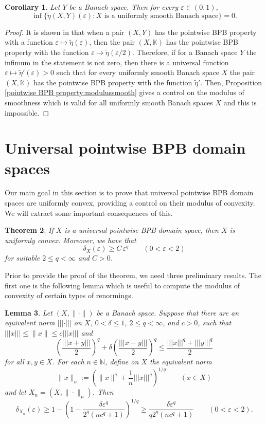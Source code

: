 \documentclass[a4paper,10pt]{amsart}
\theoremstyle{plain}
\newtheorem{theorem}{Theorem}[section]
\newtheorem{corollary}[theorem]{Corollary}
\newtheorem{lemma}[theorem]{Lemma}
\theoremstyle{definition}
\newcommand{\K}{\mathbb{K}}
\newcommand{\N}{\mathbb{N}}
\newcommand{\eps}{\varepsilon}
\renewcommand{\geq}{\geqslant}
\renewcommand{\leq}{\leqslant}
\begin{document}
\begin{corollary}\label{corollary:no-universalfunctionforrange}
Let $Y$ be a Banach space. Then for every $\eps\in (0,1)$,
$$
\inf \bigl\{ \tilde\eta(X,Y)(\eps)\colon X \text{ is a uniformly smooth Banach space}\bigr\}=0.
$$
\end{corollary}

\begin{proof}
It is shown in \cite[Proposition 2.3]{DKL} that when a pair $(X,Y)$ has the pointwise BPB property with a function $\eps\longmapsto \tilde\eta(\eps)$, then the pair $(X,\K)$ has the pointwise BPB property with the function $\eps\longmapsto \tilde\eta(\eps/2)$. Therefore, if for a Banach space $Y$ the infimum in the statement is not zero, then there is a universal function $\eps\longmapsto \tilde\eta'(\eps)>0$ such that for every uniformly smooth Banach space $X$ the pair $(X,\K)$ has the pointwise BPB property with the function $\tilde\eta'$. Then, Proposition \ref{pointwise BPB property:modulussmooth} gives a control on the modulus of smoothness which is valid for all uniformly smooth Banach spaces $X$ and this is impossible.
\end{proof}

\section{Universal pointwise BPB domain spaces}\label{sect:domain}

Our main goal in this section is to prove that universal pointwise BPB domain spaces are uniformly convex, providing a control on their modulus of convexity. We will extract some important consequences of this.

\begin{theorem}\label{thm1}
If $X$ is a universal pointwise BPB domain space, then $X$ is uniformly convex. Moreover, we have that
\[
\delta_{X}(\eps) \geq C\,\eps^q\qquad (0<\eps<2)
\]
for suitable $2\leq q<\infty$ and $C>0$.
\end{theorem}

Prior to provide the proof of the theorem, we need three preliminary results. The first one is the following lemma which is useful to compute the modulus of convexity of certain types of renormings.

\begin{lemma}\label{lem1}
Let $(X, \|\cdot\|)$ be a Banach space. Suppose that there are an equivalent norm $||| \cdot |||$ on $X$,  $0<\delta\leq 1$, $2\leq q<\infty$, and $c>0$, such that $||| x||| \leq \|x\| \leq c|||x|||$ and
\[
\left( \frac{|||x+y|||}{2}\right)^q+\delta \left( \frac{|||x-y|||}{2}\right)^q \leq \frac{|||x|||^q+|||y|||^q}{2}
\]
for all $x, y\in X$. For each $n \in \N$, define on $X$ the equivalent norm
\begin{equation*}
\|x\|_n := \left( \|x\|^q + \frac{1}{n}|||x|||^q \right)^{1/q} \qquad (x \in X)
\end{equation*}
and let $X_n = (X, \| \cdot \|_n)$. Then
\[
\delta_{X_n}(\eps) \geq 1- \left(1-\frac{\delta \eps^q}{2^q(nc^q + 1)}\right)^{1/q}\geq \frac{\delta \eps^q}{q2^q(nc^q+1)}\qquad (0<\eps<2).
\]
\end{lemma}
\end{document}
